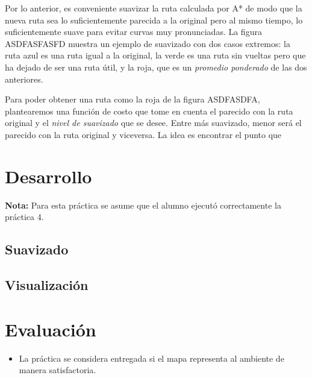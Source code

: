 \documentclass[letterpaper,12pt]{article}
\begin{document}
Por lo anterior, es conveniente suavizar la ruta calculada por A* de modo que la nueva ruta sea lo suficientemente parecida a la original pero al mismo tiempo, lo suficientemente suave para evitar curvas muy pronunciadas. La figura ASDFASFASFD muestra un ejemplo de suavizado con dos casos extremos: la ruta azul es una ruta igual a la original, la verde es una ruta sin vueltas pero que ha dejado de ser una ruta útil, y la roja, que es un \textit{promedio ponderado} de las dos anteriores. 

Para poder obtener una ruta como la roja de la figura ASDFASDFA, plantearemos una función de costo que tome en cuenta el parecido con la ruta original y el \textit{nivel de suavizado} que se desee. Entre más suavizado, menor será el parecido con la ruta original y viceversa. La idea es encontrar el punto que 

\section{Desarrollo}
\textbf{Nota:} Para esta práctica se asume que el alumno ejecutó correctamente la práctica 4.


\subsection{Suavizado}
\subsection{Visualización}
\section{Evaluación}
\begin{itemize}
\item La práctica se considera entregada si el mapa representa al ambiente de manera satisfactoria. 
\end{itemize}
\end{document}

